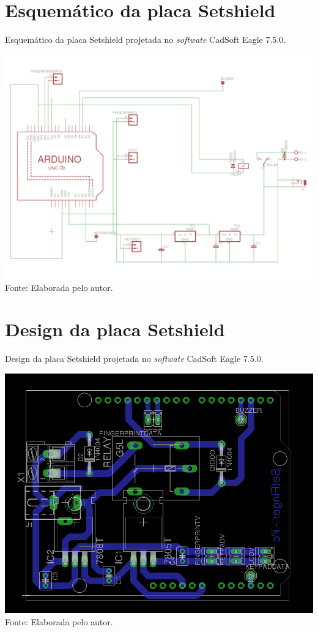 \chapter{Esquemático da placa Setshield \label{schematic_setshield}}

Esquemático da placa Setshield projetada no \textit{softwate} CadSoft Eagle 7.5.0.
  \begin{center}
  \includegraphics[scale=0.55]{figuras/anexos_e_apendices/schematic_setshield.png}\\
  Fonte: Elaborada pelo autor.
  \end{center}


\chapter{Design da placa Setshield \label{board_setshield}}

Design da placa Setshield projetada no \textit{softwate} CadSoft Eagle 7.5.0.

  \begin{center}
  \includegraphics[scale=0.55]{figuras/anexos_e_apendices/board_setshield.png}\\
  Fonte: Elaborada pelo autor.
  \end{center}
  
\newpage